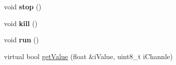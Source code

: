 \begin{DoxyCompactItemize}
\item 
\hypertarget{class_c_b_m_a180_a9c54282ad9d0ea67093ae901f4205869}{void {\bfseries stop} ()}\label{class_c_b_m_a180_a9c54282ad9d0ea67093ae901f4205869}

\item 
\hypertarget{class_c_b_m_a180_a76999767859139f406b78aca9aacb202}{void {\bfseries kill} ()}\label{class_c_b_m_a180_a76999767859139f406b78aca9aacb202}

\item 
\hypertarget{class_c_b_m_a180_ad3ee3468195d3473ffbc3a9cbd8e6e5f}{void {\bfseries run} ()}\label{class_c_b_m_a180_ad3ee3468195d3473ffbc3a9cbd8e6e5f}

\item 
virtual bool \hyperlink{class_c_b_m_a180_a3b4fca3c7e96f59da8f53c5a795cbbcb}{get\-Value} (float \&i\-Value, uint8\-\_\-t i\-Channle)
\end{DoxyCompactItemize}


